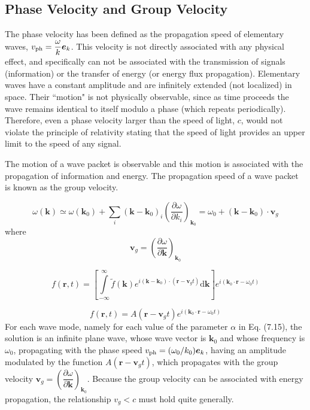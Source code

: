 \documentclass[12pt,a4paper]{article}
\renewcommand{\vec}[1]{\boldsymbol{#1}}
\newcommand{\dif}{\mathrm{d}}
\begin{document}
\subsection{Phase Velocity and Group Velocity}
The phase velocity has been defined as the propagation speed of elementary waves, $v_{\rm ph} = \dfrac{\omega}{k} \vec{e}_k$. This velocity is not directly associated with any physical effect, and specifically can not be associated with the transmission of signals (information) or the transfer of energy (or energy flux propagation). Elementary waves have a constant amplitude and are infinitely extended (not localized) in space. Their ``motion" is not physically observable, since as time proceeds the wave remains identical to itself modulo a phase (which repeats periodically). Therefore, even a phase velocity larger than the speed of light, $c$, would not violate the principle of relativity stating that the speed of light provides an upper limit to the speed of any signal.

The motion of a wave packet is observable and this motion is associated with the propagation of information and energy. The propagation speed of a wave packet is known as the group velocity.

\begin{equation*}
\omega(\vec{k}) \simeq \omega(\vec{k}_0) +\sum_i (\vec{k} -\vec{k}_0)_i \left(\frac{\partial \omega}{\partial k_i} \right)_{\vec{k}_0} = \omega_0 +(\vec{k} -\vec{k}_0) \cdot \vec{v}_g
\end{equation*}
where
\begin{equation}
\vec{v}_g = \left(\frac{\partial \omega}{\partial \vec{k}} \right)_{\vec{k}_0} 
\end{equation}

\begin{equation}
f(\vec{r}, t) = \left[\int\limits_{-\infty}^\infty \tilde{f}(\vec{k}) e^{i (\vec{k}-\vec{k}_0)\cdot (\vec{r} -\vec{v}_g t)} \dif \vec{k} \right] e^{i (\vec{k}_0\cdot \vec{r} -\omega_0 t)}
\end{equation}

\begin{equation*}
f(\vec{r}, t) = A (\vec{r} -\vec{v}_g t) e^{i (\vec{k}_0\cdot \vec{r} -\omega_0 t)}
\end{equation*}
For each wave mode, namely for each value of the parameter $\alpha$ in Eq. (7.15), the solution is an infinite plane wave, whose wave vector is $\vec{k}_0$ and whose frequency is $\omega_0$, propagating with the  phase speed $v_{\rm ph} = (\omega_0/k_0) \vec{e}_k$, having an amplitude modulated by the function $A (\vec{r} -\vec{v}_g t) $, which propagates with the group velocity $\vec{v}_g = \left(\dfrac{\partial \omega}{\partial \vec{k}} \right)_{\vec{k}_0} $. Because the group velocity can be associated with energy propagation, the relationship $v_g < c$ must hold quite generally.
\end{document}
